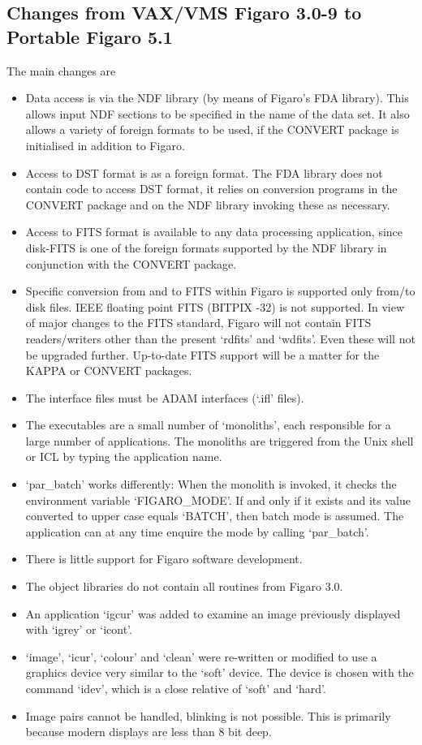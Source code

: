 \subsection{\label{changes}Changes from VAX/VMS Figaro 3.0-9 to Portable Figaro 5.1}

   The main changes are

\begin{itemize}
\item
   Data access is via the NDF library (by means of Figaro's FDA
   library). This allows input NDF sections to be specified in the
   name of the data set. It also allows a variety of foreign formats
   to be used, if the CONVERT package is initialised in addition to
   Figaro.
\item
   Access to DST format is as a foreign format. The FDA library does
   not contain code to access DST format, it relies on conversion
   programs in the CONVERT package and on the NDF library invoking
   these as necessary.
\item
   Access to FITS format is available to any data processing
   application, since disk-FITS is one of the foreign formats
   supported by the NDF library in conjunction with the CONVERT
   package.
\item
   Specific conversion from and to FITS within Figaro is supported
   only from/to disk files. IEEE floating point FITS (BITPIX -32) is
   not supported. In view of major changes to the FITS standard,
   Figaro will not contain FITS readers/writers other than the present
   `rdfits' and `wdfits'. Even these will not be upgraded further.
   Up-to-date FITS support will be a matter for the KAPPA or CONVERT
   packages.
\item
   The interface files must be ADAM interfaces (`.ifl' files).
\item
   The executables are a small number of `monoliths', each responsible
   for a large number of applications. The monoliths are triggered from
   the Unix shell or ICL by typing the application name.
\item
   `par\_batch' works differently: When the monolith is invoked, it
   checks the environment variable `FIGARO\_MODE'. If and only if it
   exists and its value converted to upper case equals `BATCH', then
   batch mode is assumed. The application can at any time enquire the
   mode by calling `par\_batch'.
\item
   There is little support for Figaro software development.
\item
   The object libraries do not contain all routines from Figaro 3.0.
\item
   An application `igcur' was added to examine an image previously
   displayed with `igrey' or `icont'.
\item
   `image', `icur', `colour' and  `clean' were re-written or modified to
   use a graphics device very similar to the `soft' device. The device
   is chosen with the command `idev', which is a close relative of
   `soft' and `hard'.
\item
   Image pairs cannot be handled, blinking is not possible. This is
   primarily because modern displays are less than 8 bit deep.
\end{itemize}

